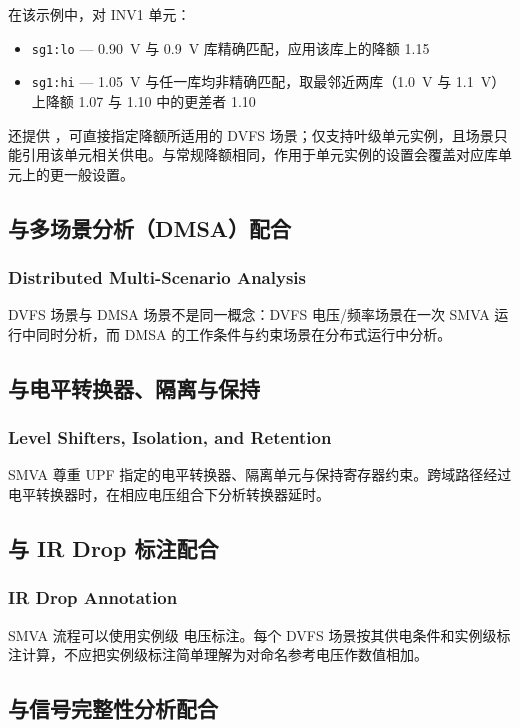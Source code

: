 在该示例中，对 INV1 单元：
\begin{itemize}
  \item \texttt{sg1:lo} — 0.90~V 与 0.9~V 库精确匹配，应用该库上的降额 1.15
  \item \texttt{sg1:hi} — 1.05~V 与任一库均非精确匹配，取最邻近两库（1.0~V 与 1.1~V）上降额 1.07 与 1.10 中的更差者 1.10
\end{itemize}

 还提供 ，可直接指定降额所适用的 DVFS 场景；仅支持叶级单元实例，且场景只能引用该单元相关供电。与常规降额相同，作用于单元实例的设置会覆盖对应库单元上的更一般设置。

\subsection{与多场景分析（DMSA）配合}
\subsubsection*{Distributed Multi-Scenario Analysis}

DVFS 场景与 DMSA 场景不是同一概念：DVFS 电压/频率场景在一次 SMVA 运行中同时分析，而 DMSA 的工作条件与约束场景在分布式运行中分析。

\subsection{与电平转换器、隔离与保持}
\subsubsection*{Level Shifters, Isolation, and Retention}

SMVA 尊重 UPF 指定的电平转换器、隔离单元与保持寄存器约束。跨域路径经过电平转换器时，在相应电压组合下分析转换器延时。

\subsection{与 IR Drop 标注配合}
\subsubsection*{IR Drop Annotation}

SMVA 流程可以使用实例级  电压标注。每个 DVFS 场景按其供电条件和实例级标注计算，不应把实例级标注简单理解为对命名参考电压作数值相加。

\subsection{与信号完整性分析配合}
